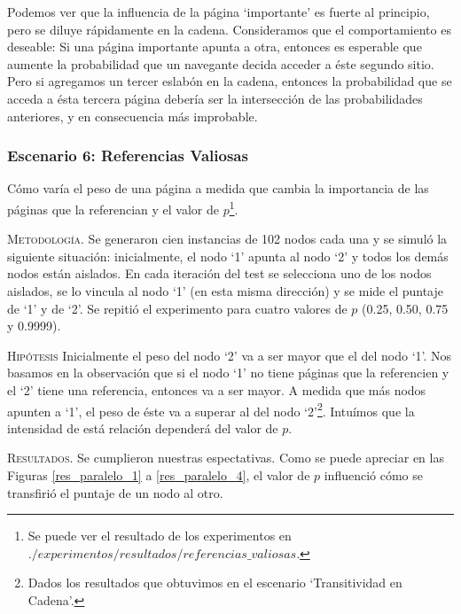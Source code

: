 \vspace{1em}
Podemos ver que la influencia de la página `importante' es fuerte al principio, pero se diluye rápidamente en la cadena. Consideramos que el comportamiento es deseable: Si una página importante apunta a otra, entonces es esperable que aumente la probabilidad que un navegante decida acceder a éste segundo sitio. Pero si agregamos un tercer eslabón en la cadena, entonces la probabilidad que se acceda a ésta tercera página debería ser la intersección de las probabilidades anteriores, y en consecuencia más improbable. 





\newpage
\subsubsection{Escenario 6: Referencias Valiosas} Cómo varía el peso de una página a medida que cambia la importancia de las páginas que la referencian y el valor de $p$\footnote{Se puede ver el resultado de los experimentos en $./experimentos/resultados/referencias\_valiosas$.}.

\vspace{1em}
\noindent \textsc{Metodología}. Se generaron cien instancias de 102 nodos cada una y se simuló la siguiente situación: inicialmente, el nodo `1' apunta al nodo `2' y todos los demás nodos están aislados. En cada iteración del test se selecciona uno de los nodos aislados, se lo vincula al nodo `1' (en esta misma dirección) y se mide el puntaje de `1' y de `2'. Se repitió el experimento para cuatro valores de $p$ (0.25, 0.50, 0.75 y 0.9999).

\vspace{2em}

\vspace{1em}
\noindent \textsc{Hipótesis} Inicialmente el peso del nodo `2' va a ser mayor que el del nodo `1'. Nos basamos en la observación que si el nodo `1' no tiene páginas que la referencien y el `2' tiene una referencia, entonces va a ser mayor. A medida que más nodos apunten a `1', el peso de éste va a superar al del nodo `2'\footnote{Dados los resultados que obtuvimos en el escenario `Transitividad en Cadena'.}. Intuímos que la intensidad de está relación dependerá del valor de $p$.

\vspace{1em}
\noindent \textsc{Resultados}. Se cumplieron nuestras espectativas. Como se puede apreciar en las Figuras \ref{res_paralelo_1} a  \ref{res_paralelo_4}, el valor de $p$ influenció cómo se transfirió el puntaje de un nodo al otro. 

